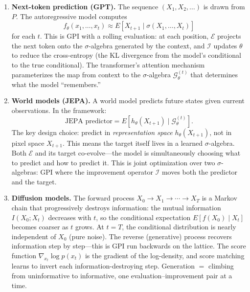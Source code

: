 \begin{example}
\begin{enumerate}[label=(\alph*)]
\item \textbf{Next-token prediction (GPT).} The sequence $(X_1, X_2, \ldots)$ is drawn from $P$. The autoregressive model computes
\[
f_\theta(x_1, \ldots, x_t) \approx E[X_{t+1} \mid \sigma(X_1, \ldots, X_t)]
\]
for each $t$. This is GPI with a rolling evaluation: at each position, $\mathcal{E}$ projects the next token onto the $\sigma$-algebra generated by the context, and $\mathcal{I}$ updates $\theta$ to reduce the cross-entropy (the KL divergence from the model's conditional to the true conditional). The transformer's attention mechanism parameterizes the map from context to the $\sigma$-algebra $\mathcal{G}_\theta^{(t)}$ that determines what the model ``remembers.''

\item \textbf{World models (JEPA).} A world model predicts future states given current observations. In the framework:
\[
\text{JEPA predictor} = E[h_\theta(X_{t+1}) \mid \mathcal{G}_\theta^{(t)}].
\]
The key design choice: predict in \emph{representation space} $h_\theta(X_{t+1})$, not in pixel space $X_{t+1}$. This means the target itself lives in a learned $\sigma$-algebra. Both $\mathcal{E}$ and its target co-evolve---the model is simultaneously choosing what to predict and how to predict it. This is joint optimization over two $\sigma$-algebras: GPI where the improvement operator $\mathcal{I}$ moves both the predictor and the target.

\item \textbf{Diffusion models.} The forward process $X_0 \to X_1 \to \cdots \to X_T$ is a Markov chain that progressively destroys information: the mutual information $I(X_0; X_t)$ decreases with $t$, so the conditional expectation $E[f(X_0) \mid X_t]$ becomes coarser as $t$ grows. At $t = T$, the conditional distribution is nearly independent of $X_0$ (pure noise). The reverse (generative) process recovers information step by step---this is GPI run backwards on the lattice. The score function $\nabla_{x_t} \log p(x_t)$ is the gradient of the log-density, and score matching learns to invert each information-destroying step. Generation $=$ climbing from uninformative to informative, one evaluation--improvement pair at a time.

\end{enumerate}
\end{example}

